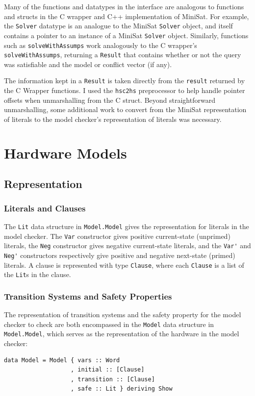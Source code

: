 \documentclass[12pt,a4paper,twoside,openright]{report}
\begin{document}
{Many of the functions and datatypes in the interface are analogous to functions and structs in
the C wrapper and C++ implementation of MiniSat. For example, the \verb,Solver, datatype is an
analogue to the MiniSat \verb,Solver, object, and itself contains a pointer to an instance of
a MiniSat \verb,Solver, object. Similarly, functions such as \verb,solveWithAssumps, work
analogously to the C wrapper's \verb,solveWithAssumps,, returning a \verb,Result, that contains
whether or not the query was satisfiable and the model or conflict vector (if any).

The information kept in a \verb,Result, is taken directly from the \verb,result, returned by
the C Wrapper functions. I used the \verb,hsc2hs, preprocessor to help handle pointer offsets
when unmarshalling from the C struct. Beyond straightforward unmarshalling, some additional work
to convert from the MiniSat representation of literals to the model checker’s representation of
literals was necessary.

\section{Hardware Models}
\label{impl:representation}
\subsection{Representation}
\subsubsection{Literals and Clauses}
The \verb,Lit, data structure in \verb,Model.Model, gives the representation for literals in
the model checker.
The \verb,Var, constructor gives positive current-state (unprimed) literals, the \verb,Neg,
constructor gives negative current-state literals, and the \verb,Var', and \verb,Neg', constructors
respectively give positive and negative next-state (primed) literals.
A clause is represented with type \verb,Clause,, where each \verb,Clause, is a
list of the \verb,Lit,s in the clause.

\subsubsection{Transition Systems and Safety Properties}
The representation of transition systems and the safety property for the model checker to check
are both encompassed in the \verb,Model, data structure in \verb,Model.Model,, which serves
as the representation of the hardware in the model checker:
\begin{lstlisting}
data Model = Model { vars :: Word
                   , initial :: [Clause]
                   , transition :: [Clause]
                   , safe :: Lit } deriving Show
\end{lstlisting}

}
\end{document}
